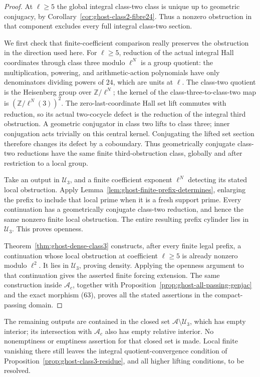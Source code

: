 \begin{proof}
At \(\ell\ge5\) the global integral class-two
class is unique up to geometric conjugacy, by
Corollary~\ref{cor:ghost-class2-fibre24}. Thus a
nonzero obstruction in that component excludes
every full integral class-two section.

We first check that finite-coefficient comparison
really preserves the obstruction in the direction
used here. For \(\ell\ge5\), reduction of the
actual integral Hall coordinates through class
three modulo \(\ell^N\) is a group quotient:
the multiplication, powering, and arithmetic-action
polynomials have only denominators dividing powers
of \(24\), which are units at \(\ell\).
The class-two quotient is the Heisenberg group
over \(\mathbb Z/\ell^N\); the kernel of the
class-three-to-class-two map is
\((\mathbb Z/\ell^N(3))^2\).
The zero-last-coordinate Hall set lift commutes
with reduction, so its actual two-cocycle defect
is the reduction of the integral third obstruction.
A geometric conjugator in class two lifts to class
three; inner conjugation acts trivially on this
central kernel. Conjugating the lifted set section
therefore changes its defect by a coboundary.
Thus geometrically conjugate class-two reductions
have the same finite third-obstruction class,
globally and after restriction to a local group.

Take an output in \(\mathscr U_3\), and a finite
coefficient exponent \(\ell^N\) detecting its
stated local obstruction. Apply
Lemma~\ref{lem:ghost-finite-prefix-determines},
enlarging the prefix to include that local prime
when it is a fresh support prime. Every continuation
has a geometrically conjugate class-two reduction,
and hence the same nonzero finite local obstruction.
The entire resulting prefix cylinder lies in
\(\mathscr U_3\). This proves openness.

Theorem~\ref{thm:ghost-dense-class3} constructs,
after every finite legal prefix, a continuation
whose local obstruction at coefficient \(\ell\ge5\)
is already nonzero modulo \(\ell^2\). It lies
in \(\mathscr U_3\), proving density. Applying
the openness argument to that continuation gives
the asserted finite forcing extension. The same
construction inside \(\mathscr A_c\), together
with Proposition~\ref{prop:ghost-all-passing-genjac}
and the exact morphism (63), proves all the stated
assertions in the compact-passing domain.
\end{proof}

The remaining outputs are contained in the closed
set \(\mathscr A\setminus\mathscr U_3\), which
has empty interior; its intersection with
\(\mathscr A_c\) also has empty relative interior.
No nonemptiness or emptiness assertion for that
closed set is made. Local finite vanishing there
still leaves the integral quotient-convergence
condition of Proposition~\ref{prop:ghost-class3-residue},
and all higher lifting conditions, to be resolved.
